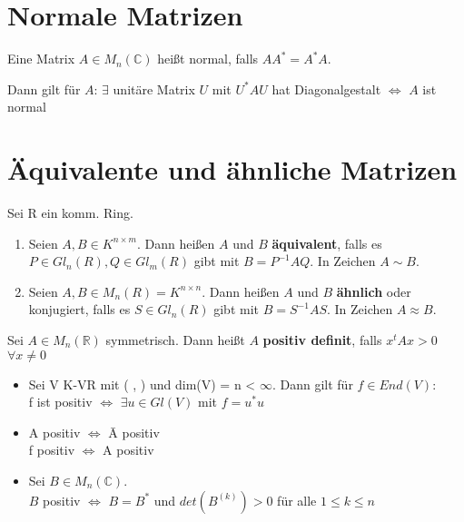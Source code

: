 \section{Normale Matrizen}
\begin{definition}
Eine Matrix $A \in M_n(\mathbb{C})$ heißt normal, falls $AA^* = A^*A$.
\end{definition}
\begin{lemma}
Dann gilt für $A$: $\exists$ unitäre Matrix $U$ mit $U^*AU$ hat Diagonalgestalt $\Leftrightarrow$ $A$ ist normal
\end{lemma}

\section{Äquivalente und ähnliche Matrizen}
\begin{definition}
Sei R ein komm. Ring.
\begin{enumerate}
	\item Seien $A,B \in K^{n \times m}$. Dann heißen $A$ und $B$ \textbf{äquivalent}, falls es $P \in Gl_n(R), Q \in Gl_m(R)$ gibt mit $B=P^{-1}AQ$. In Zeichen $A \sim B$.
	\item Seien $A,B \in M_n(R) = K^{n \times n}$. Dann heißen $A$ und $B$ \textbf{ähnlich} oder konjugiert, falls es $S \in Gl_n(R)$ gibt mit $B=S^{-1}AS$. In Zeichen $A \approx B$.
\end{enumerate}
\end{definition}


\begin{definition}
Sei $A \in M_n(\mathbb{R})$ symmetrisch. Dann heißt $A$ \textbf{positiv definit}, falls $x^tAx > 0$ $\forall x \neq 0$
\end{definition}

\begin{theorem}
\leavevmode
\begin{itemize}
\item Sei V K-VR mit ( , ) und dim(V) = n < $\infty$. Dann gilt für $f \in End(V)$:\\
f ist positiv $\Leftrightarrow$ $\exists u \in Gl(V)$ mit $f = u^*u$
\item A positiv $\Leftrightarrow$ \={A} positiv\\
f positiv $\Leftrightarrow$ A positiv
\item Sei $B \in M_n(\mathbb{C})$.\\
$B$ positiv $\Leftrightarrow$ $B = B^*$ und $det(B^{(k)}) > 0$ für alle $1 \le k \le n$
\end{itemize}
\end{theorem}

